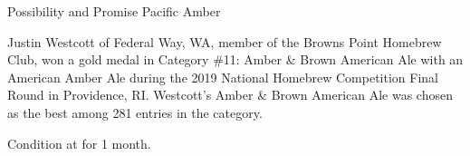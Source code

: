 \begin{recipe}{Possibility and Promise Pacific Amber}

\begin{aboutblock}
Justin Westcott of Federal Way, WA, member of the Browns Point Homebrew Club, won
a gold medal in Category \#11: Amber \& Brown American Ale with an American Amber
Ale during the 2019 National Homebrew Competition Final Round in Providence, RI.
Westcott's Amber \& Brown American Ale was chosen as the best among 281 entries in
the category. \sourceaha
\end{aboutblock}


\begin{methodandtiming}
 
\begin{mashsteps}
\end{mashsteps}

\begin{fermentationsteps}
\end{fermentationsteps}

\begin{directions}
Condition at  for 1 month.
\end{directions}

\end{methodandtiming}

\recipebreak

\begin{ingredientsblock}

\begin{malts}
\end{malts}

\begin{hops}
\end{hops}


\end{ingredientsblock}

\end{recipe}